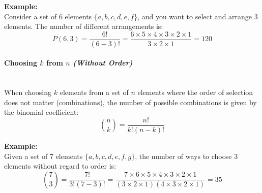 \documentclass[]{article}
\begin{document}
	\textbf{Example:}
	\noindent\\
	Consider a set of 6 elements $\{a, b, c, d, e, f\}$, and you want to select and arrange 3 elements. The number of different arrangements is:
	$$
	P(6, 3)
	= \frac{6!}{(6-3)!}
	= \frac{6 \times 5 \times 4 \times 3 \times 2 \times 1}{3 \times 2 \times 1}
	= 120
	$$
	
	\paragraph{Choosing $k$ from $n$ \textit{(Without Order)}}
	\noindent\\
	When choosing $k$ elements from a set of $n$ elements where the order of selection does not matter (combinations), the number of possible combinations is given by the binomial coefficient:
	$$
	\binom{n}{k} = \frac{n!}{k!(n-k)!}
	$$
	
	\textbf{Example:}
	\noindent\\
	Given a set of 7 elements $\{a, b, c, d, e, f, g\}$, the number of ways to choose 3 elements without regard to order is:
	$$
	\binom{7}{3}
	= \frac{7!}{3!(7-3)!}
	= \frac{7 \times 6 \times 5 \times 4 \times 3 \times 2 \times 1}{(3 \times 2 \times 1)(4 \times 3 \times 2 \times 1)}
	= 35
	$$
	
	
\end{document}
